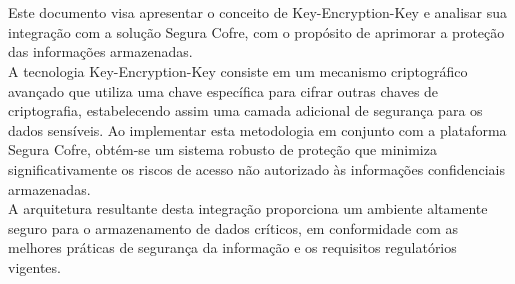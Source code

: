 \section*{}
\vspace*{\fill}
\large{Este documento visa apresentar o conceito de Key-Encryption-Key e analisar sua integração com a solução Segura Cofre, com o propósito de aprimorar a proteção das informações armazenadas.\\

A tecnologia Key-Encryption-Key consiste em um mecanismo criptográfico avançado que utiliza uma chave específica para cifrar outras chaves de criptografia, estabelecendo assim uma camada adicional de segurança para os dados sensíveis. Ao implementar esta metodologia em conjunto com a plataforma Segura Cofre, obtém-se um sistema robusto de proteção que minimiza significativamente os riscos de acesso não autorizado às informações confidenciais armazenadas.\\

A arquitetura resultante desta integração proporciona um ambiente altamente seguro para o armazenamento de dados críticos, em conformidade com as melhores práticas de segurança da informação e os requisitos regulatórios vigentes.}
\vspace*{\fill}

\pagebreak

